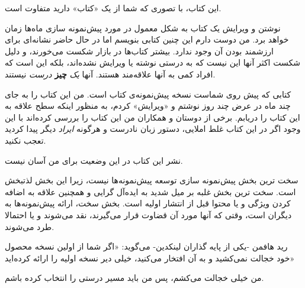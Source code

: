 این کتاب، با تصوری که شما از یک «کتاب» دارید متفاوت است.

نوشتن و ویرایش یک کتاب به شکل معمول در مورد پیش‌نمونه سازی ماه‌ها زمان
خواهد برد. من دوست دارم این چنین کتابی بنویسم اما در حال حاضر نشانه‌ای
برای ارزشمند بودن آن وجود ندارد. بیشتر کتاب‌ها در بازار شکست می‌خورند، و
دلیل شکست اکثر آنها این نیست که به درستی نوشته یا ویرایش نشده‌اند، بلکه
این است که افراد کمی به آنها علاقه‌مند هستند. آنها \emph{یک}
\textbf{چیز} \emph{درست} نیستند.

کتابی که پیش روی شماست نسخه پیش‌نمونه‌ی کتاب است. من این کتاب را به جای
چند ماه در عرض چند روز نوشتم و «ویرایش» کردم، به منظور اینکه سطح علاقه
به این کتاب را دریابم. برخی از دوستان و همکاران من این کتاب را بررسی
کرده‌اند با این وجود اگر در این کتاب غلط املایی، دستور زبان نادرست و
هرگونه \emph{ایراد} دیگر پیدا کردید تعجب نکنید.

نشر این کتاب در این وضعیت برای من آسان نیست.

سخت ترین بخش پیش‌نمونه سازی توسعه پیش‌نمونه‌ها نیست، زیرا این بخش لذتبخش
است. سخت ترین بخش غلبه بر میل شدید به ایده‌آل گرایی و همچنین علاقه به
اضافه کردن ویژگی و یا محتوا قبل از انتشار اولیه است. بخش سخت، ارائه
پیش‌نمونه‌ها به دیگران است، وقتی که آنها مورد آن قضاوت قرار می‌گیرند،
نقد می‌شوند و یا احتمالا طرد می‌شوند.

رید هافمن -یکی از پایه گذاران لینکدین- می‌گوید: «اگر شما از اولین نسخه
محصول خود خجالت نمی‌کشید و به آن افتخار می‌کنید، خیلی دیر نسخه اولیه را
ارائه کرده‌اید»

من خیلی خجالت می‌کشم، پس من باید مسیر درستی را انتخاب کرده باشم.
